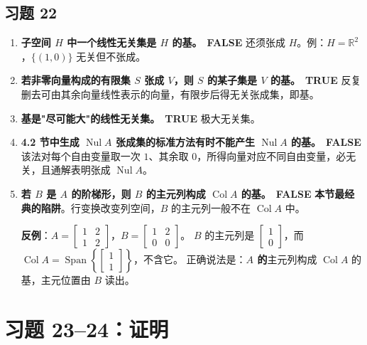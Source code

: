 \documentclass[11pt]{ctexart}
\newcommand{\Nul}{\operatorname{Nul}}
\newcommand{\Col}{\operatorname{Col}}
\newcommand{\Span}{\operatorname{Span}}
\newcommand{\R}{\mathbb{R}}
\begin{document}
\subsection*{习题 22}
\begin{enumerate}[label=\textbf{\alph*.}]
\item \textbf{子空间 $H$ 中一个线性无关集是 $H$ 的基。}\ \textcolor{tfc}{\textbf{FALSE}}\quad
还须张成 $H$。例：$H=\R^2$，$\{(1,0)\}$ 无关但不张成。

\item \textbf{若非零向量构成的有限集 $S$ 张成 $V$，则 $S$ 的某子集是 $V$ 的基。}\ \textbf{\color{acc}TRUE}\quad
反复删去可由其余向量线性表示的向量，有限步后得无关张成集，即基。

\item \textbf{基是"尽可能大"的线性无关集。}\ \textbf{\color{acc}TRUE}\quad
极大无关集。

\item \textbf{4.2 节中生成 $\Nul A$ 张成集的标准方法有时不能产生 $\Nul A$ 的基。}\ \textcolor{tfc}{\textbf{FALSE}}\quad
该法对每个自由变量取一次 $1$、其余取 $0$，所得向量对应不同自由变量，必无关，且通解表明张成 $\Nul A$。

\item \textbf{若 $B$ 是 $A$ 的阶梯形，则 $B$ 的主元列构成 $\Col A$ 的基。}\ \textcolor{tfc}{\textbf{FALSE}}\quad
\textbf{本节最经典的陷阱}。行变换改变列空间，$B$ 的主元列一般不在 $\Col A$ 中。

\smallskip
\textbf{反例}：$A=\begin{bmatrix}1&2\\1&2\end{bmatrix}$，$B=\begin{bmatrix}1&2\\0&0\end{bmatrix}$。
$B$ 的主元列是 $\begin{bmatrix}1\\0\end{bmatrix}$，而 $\Col A=\Span\left\{\begin{bmatrix}1\\1\end{bmatrix}\right\}$，不含它。
正确说法是：\textbf{$A$ 的}主元列构成 $\Col A$ 的基，主元位置由 $B$ 读出。
\end{enumerate}

\section*{习题 23--24：证明}
\end{document}
